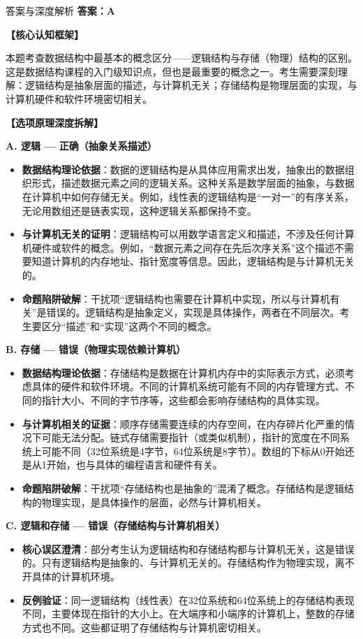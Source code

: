 \documentclass[12pt, a4paper]{article}
\newenvironment{bluebox}{\begin{framed}\begin{minipage}{\textwidth}}{\end{minipage}\end{framed}}
\begin{document}
\begin{bluebox}{答案与深度解析}
	\textbf{答案：A}

	\textbf{【核心认知框架】}

	本题考查数据结构中最基本的概念区分——逻辑结构与存储（物理）结构的区别。这是数据结构课程的入门级知识点，但也是最重要的概念之一。考生需要深刻理解：逻辑结构是抽象层面的描述，与计算机无关；存储结构是物理层面的实现，与计算机硬件和软件环境密切相关。

	\textbf{【选项原理深度拆解】}

	\item \textbf{A. 逻辑 — 正确（抽象关系描述）}
	\begin{itemize}
		\item \textbf{数据结构理论依据}：数据的逻辑结构是从具体应用需求出发，抽象出的数据组织形式，描述数据元素之间的逻辑关系。这种关系是数学层面的抽象，与数据在计算机中如何存储无关。例如，线性表的逻辑结构是“一对一”的有序关系，无论用数组还是链表实现，这种逻辑关系都保持不变。
		\item \textbf{与计算机无关的证明}：逻辑结构可以用数学语言定义和描述，不涉及任何计算机硬件或软件的概念。例如，“数据元素之间存在先后次序关系”这个描述不需要知道计算机的内存地址、指针宽度等信息。因此，逻辑结构是与计算机无关的。
		\item \textbf{命题陷阱破解}：干扰项“逻辑结构也需要在计算机中实现，所以与计算机有关”是错误的。逻辑结构是抽象定义，实现是具体操作，两者在不同层次。考生要区分“描述”和“实现”这两个不同的概念。
	\end{itemize}

	\item \textbf{B. 存储 — 错误（物理实现依赖计算机）}
	\begin{itemize}
		\item \textbf{数据结构理论依据}：存储结构是数据在计算机内存中的实际表示方式，必须考虑具体的硬件和软件环境。不同的计算机系统可能有不同的内存管理方式、不同的指针大小、不同的字节序等，这些都会影响存储结构的具体实现。
		\item \textbf{与计算机相关的证据}：顺序存储需要连续的内存空间，在内存碎片化严重的情况下可能无法分配。链式存储需要指针（或类似机制），指针的宽度在不同系统上可能不同（32位系统是4字节，64位系统是8字节）。数组的下标从0开始还是从1开始，也与具体的编程语言和硬件有关。
		\item \textbf{命题陷阱破解}：干扰项“存储结构也是抽象的”混淆了概念。存储结构是逻辑结构的物理实现，是具体操作的层面，必然与计算机相关。
	\end{itemize}

	\item \textbf{C. 逻辑和存储 — 错误（存储结构与计算机相关）}
	\begin{itemize}
		\item \textbf{核心误区澄清}：部分考生认为逻辑结构和存储结构都与计算机无关，这是错误的。只有逻辑结构是抽象的、与计算机无关的。存储结构作为物理实现，离不开具体的计算机环境。
		\item \textbf{反例验证}：同一逻辑结构（线性表）在32位系统和64位系统上的存储结构表现不同，主要体现在指针的大小上。在大端序和小端序的计算机上，整数的存储方式也不同。这些都证明了存储结构与计算机密切相关。
	\end{itemize}


\end{bluebox}
\end{document}
